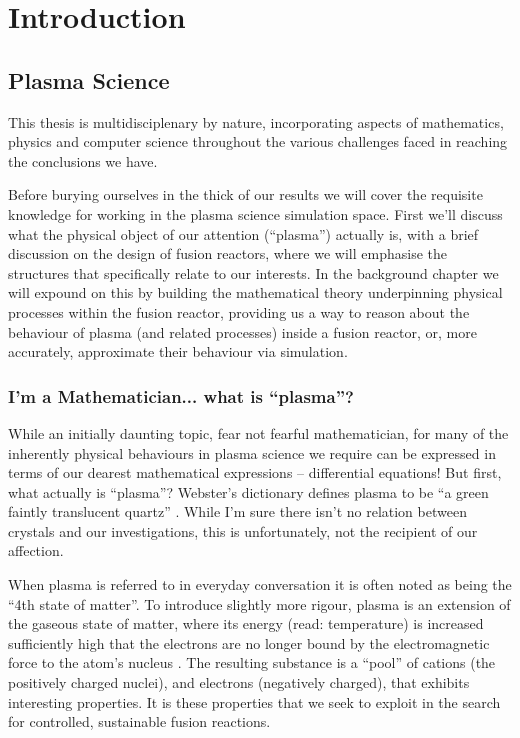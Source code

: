 
\chapter{Introduction}
\label{chapter1}

\section{Plasma Science}

This thesis is multidisciplenary by nature, incorporating aspects of mathematics, physics and computer science throughout 
the various challenges faced in reaching the conclusions we have. 


Before burying ourselves in the thick of our results we 
will cover the requisite knowledge for working in the plasma science simulation space. First we'll discuss what 
the physical object of our attention (``plasma'') actually is, with a brief discussion on the design of fusion reactors, where we will 
emphasise the structures that specifically relate to our interests. In the background chapter we will expound on this by 
building the mathematical theory underpinning physical processes within the fusion reactor, providing us a way to reason
about the behaviour of plasma (and related processes) inside a fusion reactor, or, more accurately, approximate their behaviour 
via simulation.




\subsection{I'm a Mathematician... what is ``plasma''?}

While an initially daunting topic, fear not fearful mathematician, for many of the inherently physical 
behaviours in plasma science we require can be expressed in terms of our dearest mathematical expressions -- differential equations! 
But first, what actually is ``plasma''? Webster's dictionary defines plasma to be ``a green faintly translucent quartz'' \cite{websters_plasma}. 
While I'm sure there isn't no relation between crystals and our investigations, this is unfortunately, not the recipient of our affection. 

When plasma is referred to in everyday conversation it is often noted as being the ``4th state of matter''. To introduce slightly more rigour,
plasma is an extension of the gaseous state of matter, where its energy (read: temperature) is increased sufficiently high that the electrons 
are no longer bound by the electromagnetic force to the atom's nucleus \cite{basics-of-plasma-astrophysics}. The resulting substance is a ``pool'' of cations (the positively charged nuclei), and 
electrons (negatively charged), that exhibits interesting properties. It is these properties that we seek to exploit in the search for controlled, 
sustainable fusion reactions.

